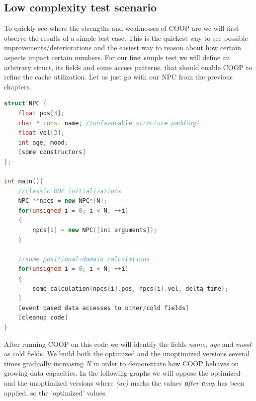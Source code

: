 \subsection{Low complexity test scenario}
To quickly see where the strengths and weaknesses of COOP are we will first observe the results of a simple test case. This is the quickest way to see possible improvements/deteriorations and the easiest way to reason about how certain aspects impact certain numbers. For our first simple test we will define an arbitrary struct, its fields and some access patterns, that should enable COOP to refine the cache utilization. Let us just go with our NPC from the previous chapters.
\begin{lstlisting}[language=C++, name={Simple test code in order to make first tests. It will heavily use an NPC's positional properties (pos, vel) and basically disregard the fields name, age and mood, as they would be accessed based on user generated events.}, label={simple_test}]
struct NPC {
	float pos[3];
	char * const name; //unfavorable structure padding!
	float vel[3];
	int age, mood;
	[some constructors]
};

int main(){
	//classic OOP initializations
	NPC **npcs = new NPC*[N];
	for(unsigned i = 0; i < N; ++i)
	{
		npcs[i] = new NPC([ini arguments]);
	}
	
	//some positional-domain calculations
	for(unsigned i = 0; i < N; ++i)
	{
		some_calculation(npcs[i].pos, npcs[i].vel, delta_time);
	}	
	[event based data accesses to other/cold fields]
	[cleanup code]
}
\end{lstlisting}
After running COOP on this code we will identify the fields \textit{name, age} and \textit{mood} as cold fields. We build both the optimized and the unoptimized versions several times gradually increasing \textit{N} in order to demonstrate how COOP behaves on growing data capacities. In the following graphs we will oppose the optimized- and the unoptimized versions where \textit{(ac)} marks the values \textit{\textbf{a}fter \textbf{c}oop} has been applied, so the 'optimized' values.
